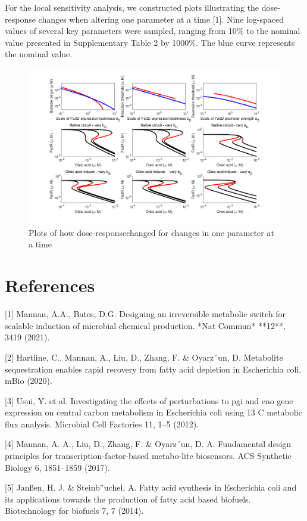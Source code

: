 \documentclass[UTF8]{article}
\begin{document}
For the local sensitivity analysis, we constructed plots illustrating the dose-response changes when altering one parameter at a time [1]. Nine log-spaced values of several key parameters were sampled, ranging from 10\% to the nominal value presented in Supplementary Table 2 by 1000\%. The blue curve represents the nominal value.
\begin{figure}[h]
	\centering
	\includegraphics[width=0.85\linewidth]{figures/dr_sen_small.png}
	\caption{Plots of how dose-responsechanged for changes in one parameter at a time}
	\label{fig:dr_sen}
\end{figure}

\section*{References}

[1] Mannan, A.A., Bates, D.G. Designing an irreversible metabolic switch for scalable induction of microbial chemical production.                    *Nat Commun* **12**, 3419 (2021). 

[2] Hartline, C., Mannan, A., Liu, D., Zhang, F. \& Oyarz´un, D. Metabolite sequestration enables rapid recovery from fatty acid depletion in Escherichia coli. mBio (2020).

[3] Usui, Y. et al. Investigating the effects of perturbations to pgi and eno gene expression on central carbon metabolism in Escherichia coli using 13 C metabolic flux analysis. Microbial Cell Factories 11, 1–5 (2012).

[4] Mannan, A. A., Liu, D., Zhang, F. \& Oyarz´un, D. A. Fundamental design principles for transcription-factor-based metabo-lite biosensors. ACS Synthetic Biology 6, 1851–1859 (2017).

[5] Janßen, H. J. \& Steinb¨uchel, A. Fatty acid synthesis in Escherichia coli and its applications towards the production of fatty acid based biofuels. Biotechnology for biofuels 7, 7 (2014).
\end{document}
